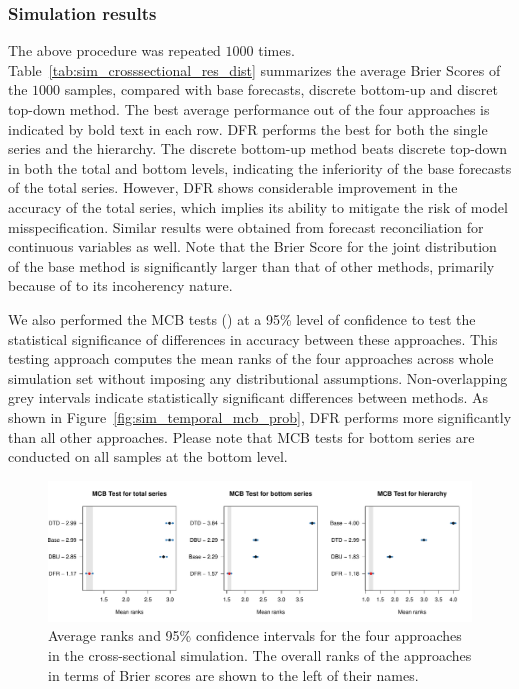 \documentclass[a4paper,review,12pt,authoryear]{elsarticle}
\begin{document}
    \subsubsection{Simulation results}
    The above procedure was repeated $1000$ times. 
    Table~\ref{tab:sim_crosssectional_res_dist} summarizes the average Brier Scores of the $1000$ samples, compared with base forecasts, discrete bottom-up and discret top-down method.
    The best average performance out of the four approaches is indicated by bold text in each row.
    DFR performs the best for both the single series and the hierarchy. 
    The discrete bottom-up method beats discrete top-down in both the total and bottom levels, indicating the inferiority of the base forecasts of the total series.
    However, DFR shows considerable improvement in the accuracy of the total series, which implies its ability to mitigate the risk of model misspecification.
    Similar results were obtained from forecast reconciliation for continuous variables as well.
    Note that the Brier Score for the joint distribution of the base method is significantly larger than that of other methods, primarily because of to its incoherency nature.
    
    We also performed the MCB tests (\citealp{koningM3CompetitionStatistical2005}) at a 95\% level of confidence to test the statistical significance of differences in accuracy between these approaches. 
    This testing approach computes the mean ranks of the four approaches across whole simulation set without imposing any distributional assumptions.
    Non-overlapping grey intervals indicate statistically significant differences between methods.
    As shown in Figure~\ref{fig:sim_temporal_mcb_prob}, DFR performs more significantly than all other approaches.
    Please note that MCB tests for bottom series are conducted on all samples at the bottom level.
  
    \begin{figure}
      \centering
      \label{fig:mcb_crosssectional}
      \caption{Average ranks and 95\% confidence intervals for the four approaches in the cross-sectional simulation. The overall ranks of the approaches in terms of Brier scores are shown to the left of their names.}
      \includegraphics[width=\textwidth]{figures/cross_sectional_mcb.pdf}
    \end{figure}
    
\end{document}
